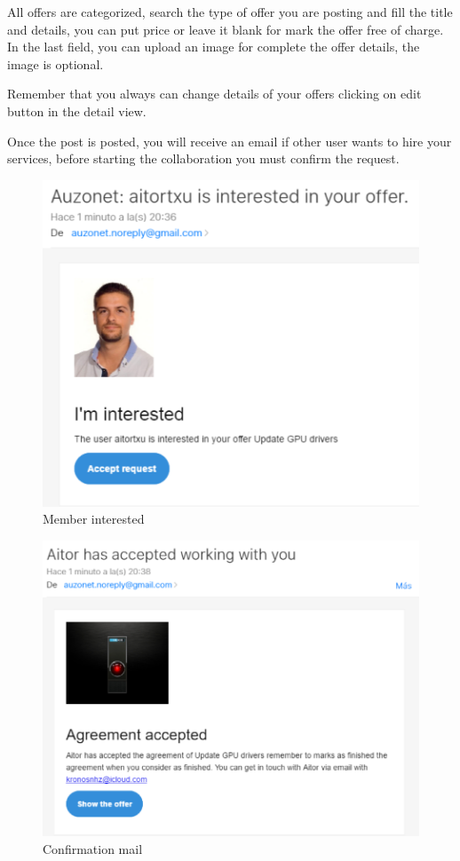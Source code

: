 \documentclass{DeustoFDP}
\begin{document}
All offers are categorized, search the type of offer you are posting and fill the title and details, you can put price or leave it blank for mark the offer free of charge. In the last field, you can upload an image for complete the offer details, the image is optional.

Remember that you always can change details of your offers clicking on edit button in the detail view.

Once the post is posted, you will receive an email if other user wants to hire your services, before starting the collaboration you must confirm the request.

\begin{figure}[h!]
\centering
\includegraphics[width=0.9\linewidth]{fig/Manual/memberinterested}
\caption[Member interested]{Member interested}
\label{fig:memberinterested}
\end{figure}

\begin{figure}[h!]
\centering
\includegraphics[width=0.9\linewidth]{fig/Manual/confirmationmail}
\caption[Confirmation mail]{Confirmation mail}
\label{fig:confirmationmail}
\end{figure}
\end{document}
